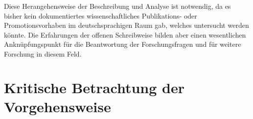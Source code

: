 Diese Herangehensweise der Beschreibung und Analyse ist notwendig, da es bisher kein dokumentiertes wissenschaftliches Publikations- oder Promotionsvorhaben im deutschsprachigen Raum gab, welches untersucht werden könnte. Die Erfahrungen der offenen Schreibweise bilden aber einen wesentlichen Anknüpfungspunkt für die Beantwortung der Forschungsfragen und für weitere Forschung in diesem Feld.

\section{Kritische Betrachtung der Vorgehensweise}
